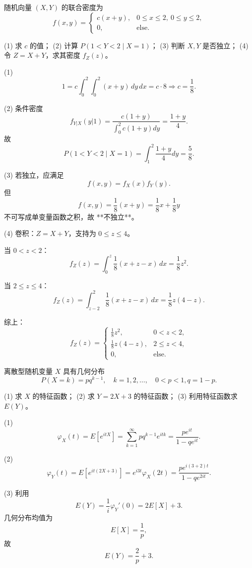 \begin{homework}[5]
随机向量 $(X,Y)$ 的联合密度为
\[
f(x,y)=
\begin{cases}
c(x+y), & 0\le x\le2,\ 0\le y\le2,\\
0, & \text{else}.
\end{cases}
\]

(1) 求 $c$ 的值；  
(2) 计算 $P(1<Y<2\mid X=1)$；  
(3) 判断 $X,Y$ 是否独立；  
(4) 令 $Z=X+Y$，求其密度 $f_Z(z)$。
\begin{solution}
(1)
\[
1=c\int_0^2\int_0^2 (x+y)\,dy\,dx
=c\cdot8
\Rightarrow c=\frac18.
\]

(2) 条件密度  
\[
f_{Y|X}(y|1)=\frac{c(1+y)}{\int_0^2 c(1+y)dy}
=\frac{1+y}{4}.
\]
故  
\[
P(1<Y<2\mid X=1)
=\int_1^2\frac{1+y}{4}dy
=\frac{5}{8}.
\]

(3) 若独立，应满足  
\[
f(x,y)=f_X(x)f_Y(y).
\]
但  
\[
f(x,y)=\frac18(x+y)=\frac18x+\frac18y
\]
不可写成单变量函数之积，故 **不独立**。

(4) 卷积：$Z=X+Y$，支持为 $0\le z\le4$。

当 $0<z<2$：
\[
f_Z(z)=\int_0^z \frac18(x+z-x)\,dx
=\frac18 z^2.
\]

当 $2\le z\le4$：
\[
f_Z(z)=\int_{z-2}^2 \frac18(x+z-x)\,dx
=\frac18 z(4-z).
\]

综上：
\[
f_Z(z)=
\begin{cases}
\frac18 z^2,&0<z<2,\\[4pt]
\frac18 z(4-z),&2\le z<4,\\[4pt]
0,&\text{else}.
\end{cases}
\]
\end{solution}
\end{homework}
\begin{homework}[6]
离散型随机变量 $X$ 具有几何分布
\[
P(X=k)=pq^{k-1},\quad k=1,2,\ldots,\quad 0<p<1,q=1-p.
\]

(1) 求 $X$ 的特征函数；  
(2) 求 $Y=2X+3$ 的特征函数；  
(3) 利用特征函数求 $E(Y)$。
\begin{solution}
(1)
\[
\varphi_X(t)=E[e^{itX}]
=\sum_{k=1}^\infty pq^{k-1}e^{itk}
=\frac{pe^{it}}{1-qe^{it}}.
\]

(2)
\[
\varphi_Y(t)=E[e^{it(2X+3)}]
=e^{i3t}\varphi_X(2t)
=\frac{pe^{i(3+2) t}}{1-qe^{2it}}.
\]

(3) 利用  
\[
E(Y)=\frac1{i}\varphi_Y'(0)
=2E[X]+3.
\]
几何分布均值为  
\[
E[X]=\frac1p,
\]
故  
\[
E(Y)=\frac{2}{p}+3.
\]
\end{solution}
\end{homework}
